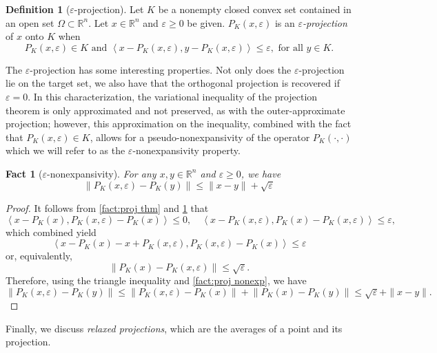 \documentclass[smallextended,numbook,nospthms]{svjour3}
\theoremstyle{plain}
\newtheorem{fact}[theorem]{Fact}
\theoremstyle{definition}
\newtheorem{definition}[theorem]{Definition}
\def\RR{\mathds R}
\newcommand{\scal}[2]{\left\langle{#1},{#2}  \right\rangle}
\begin{document}
\begin{definition}[$\varepsilon$-projection]\label{def:epsilon-projection}
	Let $K$ be a nonempty closed convex set contained in an open set $\Omega \subset \RR^n$. Let $x \in \RR^{n}$ and $\varepsilon \geq 0$ be given. $P_{K}(x, \varepsilon)$ is an \emph{$\varepsilon$-projection} of $x$ onto $K$ when
	\[
	P_{K}(x, \varepsilon) \in K \text{ and } \scal{x-P_{K}(x, \varepsilon)}{y-P_{K}(x, \varepsilon)} \leq \varepsilon, \text{ for all } y \in K.
	\]
\end{definition}
The $\varepsilon$-projection has some interesting properties. Not only does the $\varepsilon$-projection lie on the target set, we also have that the orthogonal projection is recovered if $\varepsilon=0$. In this characterization, the variational inequality of the projection theorem is only approximated and not preserved, as with the outer-approximate projection; however, this approximation on the inequality, combined with the fact that $P_{K}(x, \varepsilon) \in K$, allows for a pseudo-nonexpansivity of the operator $P_{K}(\cdot,\cdot)$ which we will refer to as the $\varepsilon$-nonexpansivity property.

\begin{fact}[$\varepsilon$-nonexpansivity]
	For any $x, y \in \RR^{n}$ and $\varepsilon \geq 0$, we have
	$$
	\left\|P_{K}(x, \varepsilon)-P_{K}(y)\right\| \leq\|x-y\|+\sqrt{\varepsilon}
	$$
\end{fact}
\begin{proof}
	It follows from \cref{fact:proj thm} and \cref{def:epsilon-projection} that
	$$
	\left\langle x-P_{K}(x), P_{K}(x, \varepsilon)-P_{K}(x)\right\rangle \leq 0, \quad\left\langle x-P_{K}(x, \varepsilon), P_{K}(x)-P_{K}(x, \varepsilon)\right\rangle \leq \varepsilon,
	$$
	which combined yield
	$$
	\left\langle x-P_{K}(x)-x+P_{K}(x, \varepsilon), P_{K}(x, \varepsilon)-P_{K}(x)\right\rangle \leq \varepsilon
	$$
	or, equivalently,
	$$
	\left\|P_{K}(x)-P_{K}(x, \varepsilon)\right\| \leq \sqrt{\varepsilon}.
	$$
	Therefore, using the triangle inequality and \cref{fact:proj nonexp}, we have
	\[
	\left\|P_{K}(x, \varepsilon)-P_{K}(y)\right\| \leq\left\|P_{K}(x, \varepsilon)-P_{K}(x)\right\|+\left\|P_{K}(x)-P_{K}(y)\right\| \leq \sqrt{\varepsilon}+\|x-y\|.
	\]
\end{proof}

Finally, we discuss \emph{relaxed projections}, which are the averages of a point and its projection.
\end{document}
